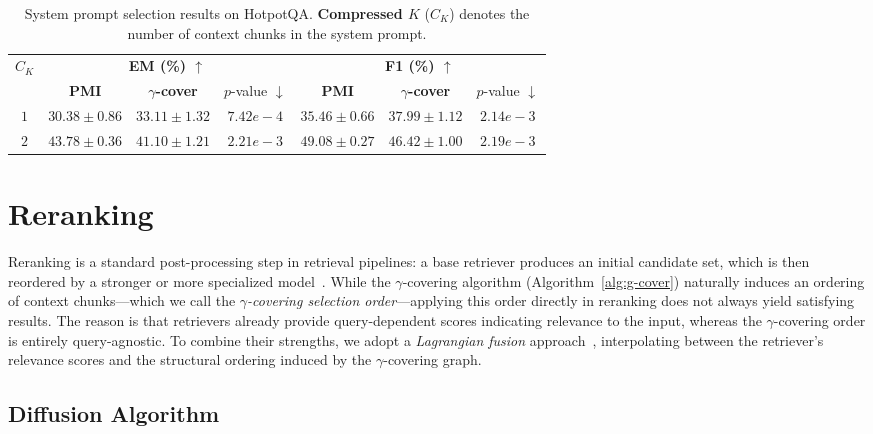 \documentclass{article} %
\theoremstyle{definition}
\begin{document}
\begin{table}[h]
\centering
\caption{\small System prompt selection results on HotpotQA.
\textbf{Compressed $K$} ($C_K$) denotes the number of context chunks in the system prompt.} 
\label{tab:system}
\begin{tabular}{c|ccc|ccc}
\toprule
\multirow{2}{*}{\small \textbf{$C_K$}} & \multicolumn{3}{c|}{\small \textbf{EM (\%) $\uparrow$}} & \multicolumn{3}{c}{\small \textbf{F1 (\%) $\uparrow$}} \\
 & \small \textbf{PMI} & \small \textbf{$\gamma$-cover} & \small $p$-value $\downarrow$ & \small \textbf{PMI} & \small \textbf{$\gamma$-cover} & \small $p$-value $\downarrow$ \\
\midrule
\small $1$ & \small $30.38 \pm 0.86$ & \small $33.11\pm 1.32 $ & \small $7.42e-4 $ & \small $35.46 \pm 0.66 $ & \small $37.99\pm 1.12 $ & \small $2.14e-3 $ \\
\midrule
\small $2$ & \small $43.78\pm 0.36$ & \small $41.10\pm 1.21$ & \small $2.21e-3 $ & \small $49.08\pm 0.27$ & \small $46.42\pm 1.00$ & \small $2.19e-3 $ \\
\bottomrule
\end{tabular}
\end{table}

\section{Reranking}

Reranking is a standard post-processing step in retrieval pipelines: a base retriever produces an initial candidate set, which is then reordered by a stronger or more specialized model~\citep{nogueira2019passage,li2020parade,carbonell1998mmr,lewis2020retrieval}. While the $\gamma$-covering algorithm (Algorithm~\ref{alg:g-cover}) naturally induces an ordering of context chunks---which we call the \emph{$\gamma$-covering selection order}---applying this order directly in reranking does not always yield satisfying results. The reason is that retrievers already provide query-dependent scores indicating relevance to the input, whereas the $\gamma$-covering order is entirely query-agnostic. To combine their strengths, we adopt a \emph{Lagrangian fusion} approach~\citep{cao2007learning,metzler2007linear}, interpolating between the retriever’s relevance scores and the structural ordering induced by the $\gamma$-covering graph.

\subsection{Diffusion Algorithm}\label{sec:diffusion-alg}
\end{document}
